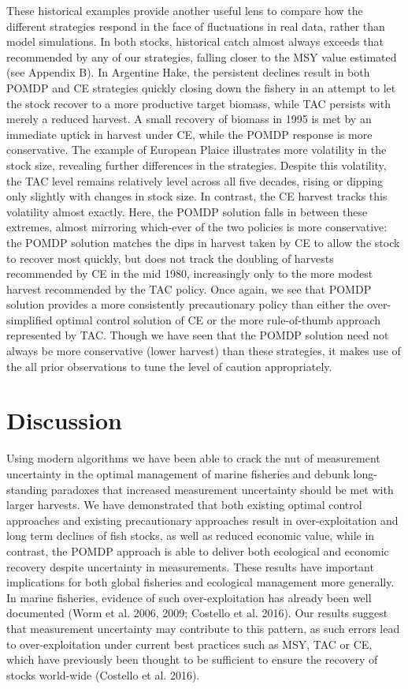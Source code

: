 \documentclass[3p]{elsarticle} %
\begin{document}
These historical examples provide another useful lens to compare how the
different strategies respond in the face of fluctuations in real data,
rather than model simulations. In both stocks, historical catch almost
always exceeds that recommended by any of our strategies, falling closer
to the MSY value estimated (see Appendix B). In Argentine Hake, the
persistent declines result in both POMDP and CE strategies quickly
closing down the fishery in an attempt to let the stock recover to a
more productive target biomass, while TAC persists with merely a reduced
harvest. A small recovery of biomass in 1995 is met by an immediate
uptick in harvest under CE, while the POMDP response is more
conservative. The example of European Plaice illustrates more volatility
in the stock size, revealing further differences in the strategies.
Despite this volatility, the TAC level remains relatively level across
all five decades, rising or dipping only slightly with changes in stock
size. In contrast, the CE harvest tracks this volatility almost exactly.
Here, the POMDP solution falls in between these extremes, almost
mirroring which-ever of the two policies is more conservative: the POMDP
solution matches the dips in harvest taken by CE to allow the stock to
recover most quickly, but does not track the doubling of harvests
recommended by CE in the mid 1980, increasingly only to the more modest
harvest recommended by the TAC policy. Once again, we see that POMDP
solution provides a more consistently precautionary policy than either
the over-simplified optimal control solution of CE or the more
rule-of-thumb approach represented by TAC. Though we have seen that the
POMDP solution need not always be more conservative (lower harvest) than
these strategies, it makes use of the all prior observations to tune the
level of caution appropriately.

\section{Discussion}\label{discussion}

Using modern algorithms we have been able to crack the nut of
measurement uncertainty in the optimal management of marine fisheries
and debunk long-standing paradoxes that increased measurement
uncertainty should be met with larger harvests. We have demonstrated
that both existing optimal control approaches and existing precautionary
approaches result in over-exploitation and long term declines of fish
stocks, as well as reduced economic value, while in contrast, the POMDP
approach is able to deliver both ecological and economic recovery
despite uncertainty in measurements. These results have important
implications for both global fisheries and ecological management more
generally. In marine fisheries, evidence of such over-exploitation has
already been well documented (Worm et al. 2006, 2009; Costello et al.
2016). Our results suggest that measurement uncertainty may contribute
to this pattern, as such errors lead to over-exploitation under current
best practices such as MSY, TAC or CE, which have previously been
thought to be sufficient to ensure the recovery of stocks world-wide
(Costello et al. 2016).
\end{document}
